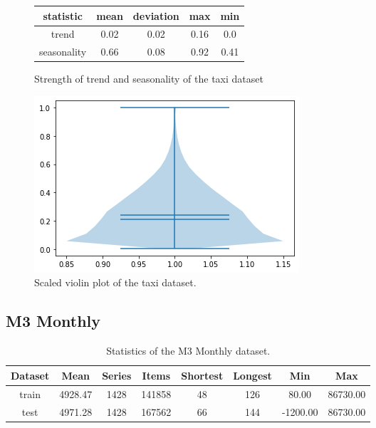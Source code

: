 \begin{figure}[htb]
    \centering
    \begin{center}
        \begin{tabular}{||c | c | c | c | c |}
            \hline
            statistic   & mean & deviation & max  & min  \\
            \hline
            trend       & 0.02 & 0.02      & 0.16 & 0.0  \\
            \hline
            seasonality & 0.66 & 0.08      & 0.92 & 0.41 \\
            \hline
            \hline
        \end{tabular}
        \caption{Strength of trend and seasonality of the taxi dataset}
    \end{center}
    \endminipage\hfill
    \includegraphics[width=\linewidth]{./img/taxi_30min_violin.png}
    \caption{Scaled violin plot of the taxi dataset.}
    \label{fig:taxi_30min_violin}
    \endminipage\hfill
\end{figure}

\clearpage
\subsection{M3 Monthly}

\begin{table}[htb]
    \begin{tabular}{||c | c c c c c c c ||}
        \hline
        Dataset & Mean    & Series & Items  & Shortest & Longest & Min      & Max      \\ [0.5ex]
        \hline\hline
        train   & 4928.47 & 1428   & 141858 & 48       & 126     & 80.00    & 86730.00 \\
        \hline
        test    & 4971.28 & 1428   & 167562 & 66       & 144     & -1200.00 & 86730.00 \\
        \hline
    \end{tabular}
    \caption{Statistics of the M3 Monthly dataset.}
\end{table}

